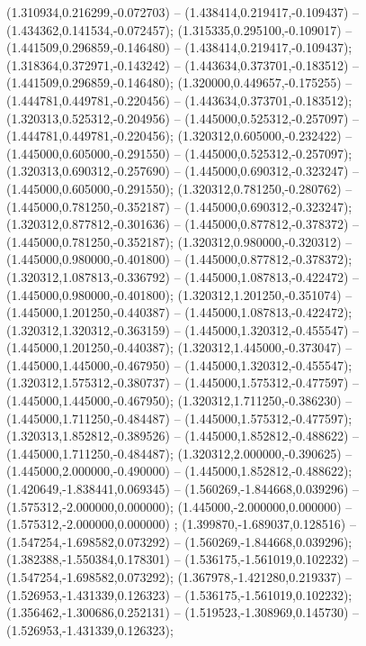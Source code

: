  (1.310934,0.216299,-0.072703) -- (1.438414,0.219417,-0.109437) -- (1.434362,0.141534,-0.072457);
 (1.315335,0.295100,-0.109017) -- (1.441509,0.296859,-0.146480) -- (1.438414,0.219417,-0.109437);
 (1.318364,0.372971,-0.143242) -- (1.443634,0.373701,-0.183512) -- (1.441509,0.296859,-0.146480);
 (1.320000,0.449657,-0.175255) -- (1.444781,0.449781,-0.220456) -- (1.443634,0.373701,-0.183512);
 (1.320313,0.525312,-0.204956) -- (1.445000,0.525312,-0.257097) -- (1.444781,0.449781,-0.220456);
 (1.320312,0.605000,-0.232422) -- (1.445000,0.605000,-0.291550) -- (1.445000,0.525312,-0.257097);
 (1.320313,0.690312,-0.257690) -- (1.445000,0.690312,-0.323247) -- (1.445000,0.605000,-0.291550);
 (1.320312,0.781250,-0.280762) -- (1.445000,0.781250,-0.352187) -- (1.445000,0.690312,-0.323247);
 (1.320312,0.877812,-0.301636) -- (1.445000,0.877812,-0.378372) -- (1.445000,0.781250,-0.352187);
 (1.320312,0.980000,-0.320312) -- (1.445000,0.980000,-0.401800) -- (1.445000,0.877812,-0.378372);
 (1.320312,1.087813,-0.336792) -- (1.445000,1.087813,-0.422472) -- (1.445000,0.980000,-0.401800);
 (1.320312,1.201250,-0.351074) -- (1.445000,1.201250,-0.440387) -- (1.445000,1.087813,-0.422472);
 (1.320312,1.320312,-0.363159) -- (1.445000,1.320312,-0.455547) -- (1.445000,1.201250,-0.440387);
 (1.320312,1.445000,-0.373047) -- (1.445000,1.445000,-0.467950) -- (1.445000,1.320312,-0.455547);
 (1.320312,1.575312,-0.380737) -- (1.445000,1.575312,-0.477597) -- (1.445000,1.445000,-0.467950);
 (1.320312,1.711250,-0.386230) -- (1.445000,1.711250,-0.484487) -- (1.445000,1.575312,-0.477597);
 (1.320313,1.852812,-0.389526) -- (1.445000,1.852812,-0.488622) -- (1.445000,1.711250,-0.484487);
 (1.320312,2.000000,-0.390625) -- (1.445000,2.000000,-0.490000) -- (1.445000,1.852812,-0.488622);
 (1.420649,-1.838441,0.069345) -- (1.560269,-1.844668,0.039296) -- (1.575312,-2.000000,0.000000);
 (1.445000,-2.000000,0.000000) -- (1.575312,-2.000000,0.000000) ;
 (1.399870,-1.689037,0.128516) -- (1.547254,-1.698582,0.073292) -- (1.560269,-1.844668,0.039296);
 (1.382388,-1.550384,0.178301) -- (1.536175,-1.561019,0.102232) -- (1.547254,-1.698582,0.073292);
 (1.367978,-1.421280,0.219337) -- (1.526953,-1.431339,0.126323) -- (1.536175,-1.561019,0.102232);
 (1.356462,-1.300686,0.252131) -- (1.519523,-1.308969,0.145730) -- (1.526953,-1.431339,0.126323);
